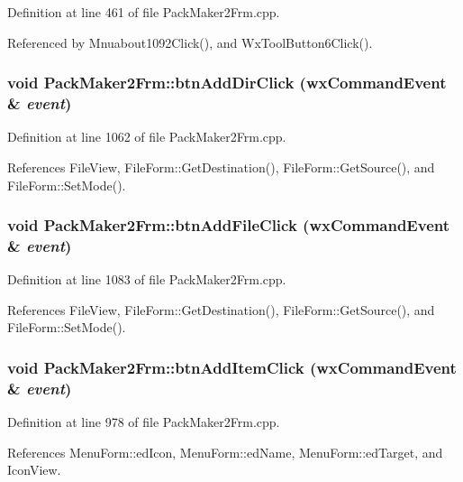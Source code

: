 Definition at line 461 of file Pack\-Maker2Frm.cpp.

Referenced by Mnuabout1092Click(), and Wx\-Tool\-Button6Click().
\subsubsection{\setlength{\rightskip}{0pt plus 5cm}void Pack\-Maker2Frm::btn\-Add\-Dir\-Click (wx\-Command\-Event \& {\em event})}\label{class_pack_maker2_frm_cee1a7ee2eb495e739e88501ea74540b}




Definition at line 1062 of file Pack\-Maker2Frm.cpp.

References File\-View, File\-Form::Get\-Destination(), File\-Form::Get\-Source(), and File\-Form::Set\-Mode().
\subsubsection{\setlength{\rightskip}{0pt plus 5cm}void Pack\-Maker2Frm::btn\-Add\-File\-Click (wx\-Command\-Event \& {\em event})}\label{class_pack_maker2_frm_f0acb0c18ffad275c5ebd15681a55998}




Definition at line 1083 of file Pack\-Maker2Frm.cpp.

References File\-View, File\-Form::Get\-Destination(), File\-Form::Get\-Source(), and File\-Form::Set\-Mode().
\subsubsection{\setlength{\rightskip}{0pt plus 5cm}void Pack\-Maker2Frm::btn\-Add\-Item\-Click (wx\-Command\-Event \& {\em event})}\label{class_pack_maker2_frm_5fa329f5e6517ee023ac2f28d3193e35}




Definition at line 978 of file Pack\-Maker2Frm.cpp.

References Menu\-Form::ed\-Icon, Menu\-Form::ed\-Name, Menu\-Form::ed\-Target, and Icon\-View.
